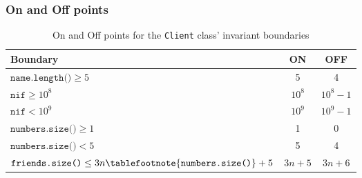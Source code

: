 \subsubsection{On and Off points}
\label{sec:classes.client.points}
\begin{table}[!htbp]
  \centering
  \begin{tabular}{|l|*{2}{c|}}
    \hline
    \textbf{Boundary}               & \textbf{ON} & \textbf{OFF} \\ \hline
    $\texttt{name.length()} \ge 5$  &     5       &      4       \\ \hline
    $\texttt{nif} \ge 10^8$         &   $10^8$    &   $10^8-1$   \\ \hline
    $\texttt{nif} < 10^9$           &   $10^9$    &   $10^9-1$   \\ \hline
    $\texttt{numbers.size()} \ge 1$ &     1       &      0       \\ \hline
    $\texttt{numbers.size()} < 5$   &     5       &      4       \\ \hline
    $\texttt{friends.size()} \le 3n\tablefootnote{\texttt{numbers.size()}} + 5$
      & $3n + 5$ & $3n + 6$ \\ \hline
  \end{tabular}
  \caption{On and Off points for the \texttt{Client} class' invariant
    boundaries}
\end{table}
\newpage


